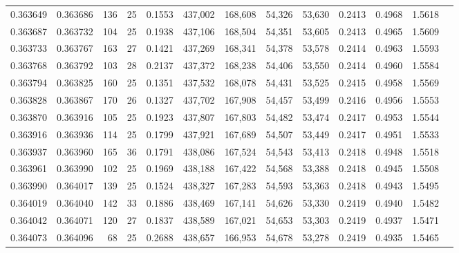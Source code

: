 \begin{tabular}{rrrrrrrrrrrrr}
0.363649 & 0.363686 &   136 &  25 &                                     0.1553 & 437,002 & 168,608 &  54,326 &  53,630 & 0.2413 & 0.4968 & 1.5618 \\
0.363687 & 0.363732 &   104 &  25 &                                     0.1938 & 437,106 & 168,504 &  54,351 &  53,605 & 0.2413 & 0.4965 & 1.5609 \\
0.363733 & 0.363767 &   163 &  27 &                                     0.1421 & 437,269 & 168,341 &  54,378 &  53,578 & 0.2414 & 0.4963 & 1.5593 \\
0.363768 & 0.363792 &   103 &  28 &                                     0.2137 & 437,372 & 168,238 &  54,406 &  53,550 & 0.2414 & 0.4960 & 1.5584 \\
0.363794 & 0.363825 &   160 &  25 &                                     0.1351 & 437,532 & 168,078 &  54,431 &  53,525 & 0.2415 & 0.4958 & 1.5569 \\
0.363828 & 0.363867 &   170 &  26 &                                     0.1327 & 437,702 & 167,908 &  54,457 &  53,499 & 0.2416 & 0.4956 & 1.5553 \\
0.363870 & 0.363916 &   105 &  25 &                                     0.1923 & 437,807 & 167,803 &  54,482 &  53,474 & 0.2417 & 0.4953 & 1.5544 \\
0.363916 & 0.363936 &   114 &  25 &                                     0.1799 & 437,921 & 167,689 &  54,507 &  53,449 & 0.2417 & 0.4951 & 1.5533 \\
0.363937 & 0.363960 &   165 &  36 &                                     0.1791 & 438,086 & 167,524 &  54,543 &  53,413 & 0.2418 & 0.4948 & 1.5518 \\
0.363961 & 0.363990 &   102 &  25 &                                     0.1969 & 438,188 & 167,422 &  54,568 &  53,388 & 0.2418 & 0.4945 & 1.5508 \\
0.363990 & 0.364017 &   139 &  25 &                                     0.1524 & 438,327 & 167,283 &  54,593 &  53,363 & 0.2418 & 0.4943 & 1.5495 \\
0.364019 & 0.364040 &   142 &  33 &                                     0.1886 & 438,469 & 167,141 &  54,626 &  53,330 & 0.2419 & 0.4940 & 1.5482 \\
0.364042 & 0.364071 &   120 &  27 &                                     0.1837 & 438,589 & 167,021 &  54,653 &  53,303 & 0.2419 & 0.4937 & 1.5471 \\
0.364073 & 0.364096 &    68 &  25 &                                     0.2688 & 438,657 & 166,953 &  54,678 &  53,278 & 0.2419 & 0.4935 & 1.5465 \\

\end{tabular}
